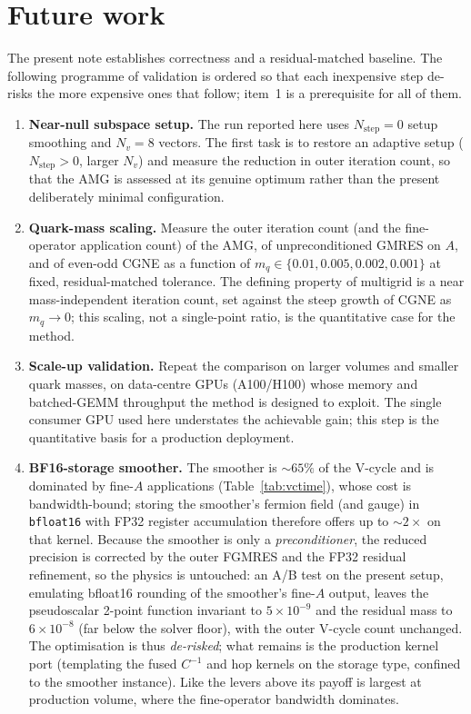 \documentclass[12pt,a4paper]{article}
\newcommand{\Aop}{A}
\begin{document}
\section{Future work}
\label{sec:future}

The present note establishes correctness and a residual-matched baseline. The
following programme of validation is ordered so that each inexpensive step
de-risks the more expensive ones that follow; item~1 is a prerequisite for all
of them.

\begin{enumerate}
\item \textbf{Near-null subspace setup.} The run reported here uses
$N_{\mathrm{step}}=0$ setup smoothing and $N_v=8$ vectors. The first task is to
restore an adaptive setup ($N_{\mathrm{step}}>0$, larger $N_v$) and measure the
reduction in outer iteration count, so that the AMG is assessed at its genuine
optimum rather than the present deliberately minimal configuration.

\item \textbf{Quark-mass scaling.} Measure the outer iteration count (and the
fine-operator application count) of the AMG, of unpreconditioned GMRES on $\Aop$,
and of even-odd CGNE as a function of $m_q\in\{0.01,0.005,0.002,0.001\}$ at fixed,
residual-matched tolerance. The defining property of multigrid is a near
mass-independent iteration count, set against the steep growth of CGNE as
$m_q\to0$; this scaling, not a single-point ratio, is the quantitative case for
the method.

\item \textbf{Scale-up validation.} Repeat the comparison on larger volumes and
smaller quark masses, on data-centre GPUs (A100/H100) whose memory and
batched-GEMM throughput the method is designed to exploit. The single consumer GPU
used here understates the achievable gain; this step is the quantitative basis for
a production deployment.

\item \textbf{BF16-storage smoother.} The smoother is ${\sim}65\%$ of the V-cycle
and is dominated by fine-$\Aop$ applications (Table~\ref{tab:vctime}), whose cost is
bandwidth-bound; storing the smoother's fermion field (and gauge) in
\texttt{bfloat16} with FP32 register accumulation therefore offers up to ${\sim}2\times$
on that kernel. Because the smoother is only a \emph{preconditioner}, the reduced
precision is corrected by the outer FGMRES and the FP32 residual refinement, so the
physics is untouched: an A/B test on the present setup, emulating bfloat16 rounding
of the smoother's fine-$\Aop$ output, leaves the pseudoscalar 2-point function
invariant to $5\times10^{-9}$ and the residual mass to $6\times10^{-8}$ (far below
the solver floor), with the outer V-cycle count unchanged. The optimisation is thus
\emph{de-risked}; what remains is the production kernel port (templating the fused
$C^{-1}$ and hop kernels on the storage type, confined to the smoother instance).
Like the levers above its payoff is largest at production volume, where the
fine-operator bandwidth dominates.
\end{enumerate}
\end{document}
